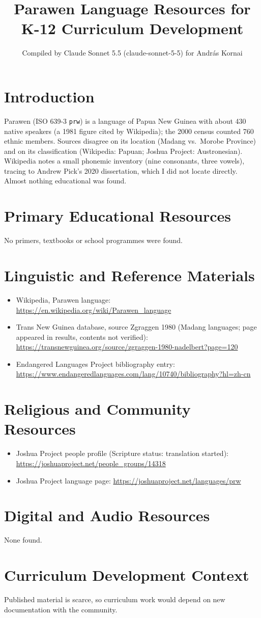 \documentclass[12pt]{article}
\title{Parawen Language Resources for K-12 Curriculum Development}
\author{Compiled by Claude Sonnet 5.5 (claude-sonnet-5-5) for Andr\'as Kornai}
\date{}
\begin{document}
\maketitle

\section{Introduction}
Parawen (ISO 639-3 \texttt{prw}) is a language of Papua New Guinea with about 430 native speakers (a 1981 figure cited by Wikipedia); the 2000 census counted 760 ethnic members. Sources disagree on its location (Madang vs.\ Morobe Province) and on its classification (Wikipedia: Papuan; Joshua Project: Austronesian). Wikipedia notes a small phonemic inventory (nine consonants, three vowels), tracing to Andrew Pick's 2020 dissertation, which I did not locate directly. Almost nothing educational was found.

\section{Primary Educational Resources}
No primers, textbooks or school programmes were found.

\section{Linguistic and Reference Materials}
\begin{itemize}
\item Wikipedia, Parawen language: \url{https://en.wikipedia.org/wiki/Parawen_language}
\item Trans New Guinea database, source Zgraggen 1980 (Madang languages; page appeared in results, contents not verified): \url{https://transnewguinea.org/source/zgraggen-1980-nadelbert?page=120}
\item Endangered Languages Project bibliography entry: \url{https://www.endangeredlanguages.com/lang/10740/bibliography?hl=zh-cn}
\end{itemize}

\section{Religious and Community Resources}
\begin{itemize}
\item Joshua Project people profile (Scripture status: translation started): \url{https://joshuaproject.net/people_groups/14318}
\item Joshua Project language page: \url{https://joshuaproject.net/languages/prw}
\end{itemize}

\section{Digital and Audio Resources}
None found.

\section{Curriculum Development Context}
Published material is scarce, so curriculum work would depend on new documentation with the community.
\end{document}
